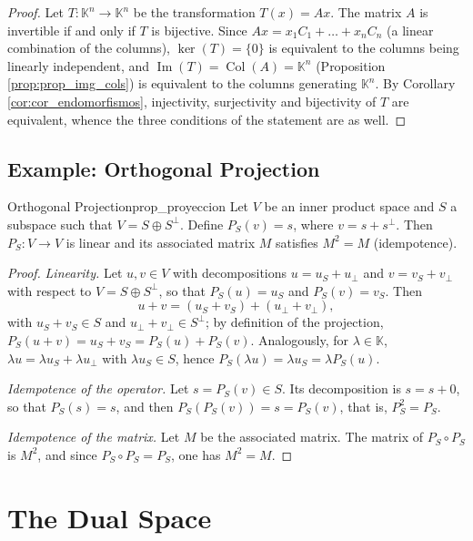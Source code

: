 \documentclass[11pt, a4paper]{article}
\begin{document}
\begin{proof}
Let $T: \mathbb{K}^n \to \mathbb{K}^n$ be the transformation $T(x) = Ax$. The matrix $A$ is invertible if and only if $T$ is bijective. Since $Ax = x_1 C_1 + \dots + x_n C_n$ (a linear combination of the columns), $\ker(T) = \{0\}$ is equivalent to the columns being linearly independent, and $\operatorname{Im}(T) = \operatorname{Col}(A) = \mathbb{K}^n$ (Proposition \ref{prop:prop_img_cols}) is equivalent to the columns generating $\mathbb{K}^n$. By Corollary \ref{cor:cor_endomorfismos}, injectivity, surjectivity and bijectivity of $T$ are equivalent, whence the three conditions of the statement are as well.
\end{proof}

\subsection{Example: Orthogonal Projection}

\begin{proposicion}{Orthogonal Projection}{prop_proyeccion}
Let $V$ be an inner product space and $S$ a subspace such that $V = S \oplus S^\perp$.
Define $P_S(v) = s$, where $v = s + s^\perp$.
Then $P_S: V \to V$ is linear and its associated matrix $M$ satisfies $M^2 = M$ (idempotence).
\end{proposicion}

\begin{proof}
\textit{Linearity.} Let $u, v \in V$ with decompositions $u = u_S + u_\perp$ and $v = v_S + v_\perp$ with respect to $V = S \oplus S^\perp$, so that $P_S(u) = u_S$ and $P_S(v) = v_S$. Then
\[ u + v = (u_S + v_S) + (u_\perp + v_\perp), \]
with $u_S + v_S \in S$ and $u_\perp + v_\perp \in S^\perp$; by definition of the projection, $P_S(u+v) = u_S + v_S = P_S(u) + P_S(v)$. Analogously, for $\lambda \in \mathbb{K}$, $\lambda u = \lambda u_S + \lambda u_\perp$ with $\lambda u_S \in S$, hence $P_S(\lambda u) = \lambda u_S = \lambda P_S(u)$.

\textit{Idempotence of the operator.} Let $s = P_S(v) \in S$. Its decomposition is $s = s + 0$, so that $P_S(s) = s$, and then $P_S(P_S(v)) = s = P_S(v)$, that is, $P_S^2 = P_S$.

\textit{Idempotence of the matrix.} Let $M$ be the associated matrix. The matrix of $P_S \circ P_S$ is $M^2$, and since $P_S \circ P_S = P_S$, one has $M^2 = M$.
\end{proof}

\newpage

\section{The Dual Space}
\end{document}
